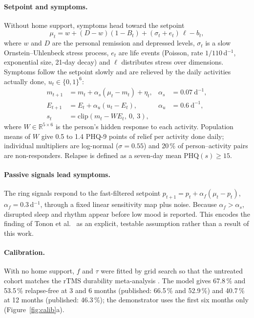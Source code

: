 \documentclass[11pt,a4paper]{article}
\begin{document}
\paragraph{Setpoint and symptoms.} Without home support, symptoms head toward the setpoint
\begin{equation}
\mu_t = w + (D - w)(1 - B_t) + (\sigma_t + e_t)\,\ell - b_t,
\end{equation}
where $w$ and $D$ are the personal remission and depressed levels, $\sigma_t$ is a slow Ornstein--Uhlenbeck stress process, $e_t$ are life events (Poisson, rate $1/110$\,d$^{-1}$, exponential size, 21-day decay) and $\ell$ distributes stress over dimensions. Symptoms follow the setpoint slowly and are relieved by the daily activities actually done, $u_t \in \{0,1\}^6$:
\begin{align}
m_{t+1} &= m_t + \alpha_s(\mu_t - m_t) + \eta_t, & \alpha_s &= 0.07\ \text{d}^{-1},\\
E_{t+1} &= E_t + \alpha_u(u_t - E_t), & \alpha_u &= 0.6\ \text{d}^{-1},\\
s_t &= \mathrm{clip}(m_t - W E_t,\ 0,\ 3), & &
\end{align}
where $W \in \mathbb{R}^{5\times 6}$ is the person's hidden response to each activity. Population means of $W$ give 0.5 to 1.4 PHQ-9 points of relief per activity done daily; individual multipliers are log-normal ($\sigma=0.55$) and 20\,\% of person--activity pairs are non-responders. Relapse is defined as a seven-day mean $\mathrm{PHQ}(s) \geq 15$.

\paragraph{Passive signals lead symptoms.} The ring signals respond to the fast-filtered setpoint $p_{t+1} = p_t + \alpha_f(\mu_t - p_t)$, $\alpha_f = 0.3$\,d$^{-1}$, through a fixed linear sensitivity map plus noise. Because $\alpha_f > \alpha_s$, disrupted sleep and rhythm appear before low mood is reported. This encodes the finding of Tonon et al.\ \cite{tonon2026} as an explicit, testable assumption rather than a result of this work.

\paragraph{Calibration.} With no home support, $f$ and $\tau$ were fitted by grid search so that the untreated cohort matches the rTMS durability meta-analysis \cite{senova2019}. The model gives 67.8\,\% and 53.5\,\% relapse-free at 3 and 6 months (published: 66.5\,\% and 52.9\,\%) and 40.7\,\% at 12 months (published: 46.3\,\%); the demonstrator uses the first six months only (Figure~\ref{fig:calib}a).
\end{document}
